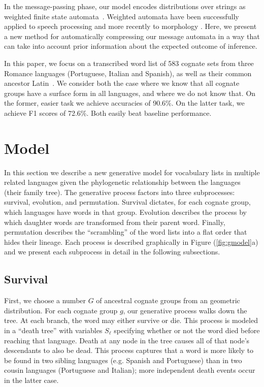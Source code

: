 \documentclass[11pt,a4paper]{article}
\begin{document}
In the message-passing phase, our model encodes distributions over
strings as weighted finite state automata~\cite{mohri09weighted}.
Weighted automata have been successfully applied to speech processing
\cite{Mohri96weightedautomata} and more recently to morphology
\cite{dreyer2009graphical}.  Here, we present a new method for
automatically compressing our message automata in a way that can
take into account prior information about the expected outcome of
inference.

In this paper, we focus on a transcribed word list of 583 cognate
sets from three Romance languages (Portuguese, Italian and Spanish),
as well as their common ancestor Latin~\cite{bouchard07probabilistic}.
We consider both the case where we know that all cognate groups
have a surface form in all languages, and where we do not know that.
On the former, easier task we achieve accuracies of 90.6\%. On the
latter task, we achieve F1 scores of 72.6\%. Both easily beat baseline
performance.

\section{Model}

In this section we describe a new generative model for vocabulary
lists in multiple related languages given the phylogenetic relationship
between the languages (their family tree). The generative process
factors into three subprocesses: survival, evolution, and permutation.
Survival dictates, for each cognate group, which languages have
words in that group. Evolution describes the process by which
daughter words are transformed from their parent word. Finally,
permutation describes the ``scrambling'' of the word lists into a
flat order that hides their lineage. Each process is described
graphically in Figure (\ref{fig:gmodel}a) and we present each
subprocess in detail in the following subsections.

\subsection{Survival}

First, we choose a number $G$ of ancestral cognate groups from an
geometric distribution. For each cognate group $g$, our generative
process walks down the tree.  At each branch, the word may either
survive or die.  This process is modeled in a ``death tree'' with
variables $S_\ell$ specifying whether or not the word died before
reaching that language. Death at any node in the tree causes all
of that node's descendants to also be dead.  This process captures
that a word is more likely to be found in two sibling languages
(e.g. Spanish and Portuguese) than in two cousin languages (Portuguese
and Italian); more independent death events occur in the latter
case.
\end{document}
